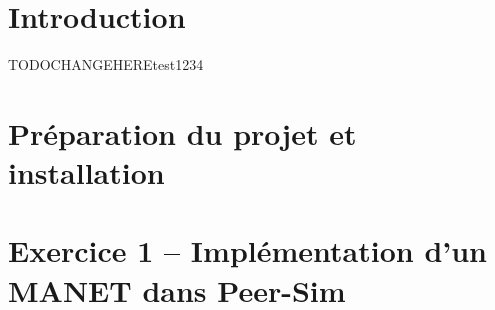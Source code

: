 \documentclass[11pt,a4paper,sans]{report}
\begin{document}
\newpage
\tableofcontents
\vspace*{3cm}
\begingroup\let\clearpage\relax

	\newpage
	\chapter{Introduction}

	\begin{comment}
		TODO intro du projet, nos remarques. + Explication du fichier de config accompagnées d’un fichier texte "Readme"
		indiquant comment compiler le projet et lancer les différentes simulations (votre projet doit pouvoir se compiler/lancer en dehors d’Eclipse) Votre rapport, au format pdf, concis, dans lequel vous devez répondre aux questions posées dans le sujet.
	\end{comment}

	TODOCHANGEHEREtest1234\cite{greenwade93}

	\newpage
	\chapter{Préparation du projet et installation}
	\newpage
	\chapter{Exercice 1 – Implémentation d’un MANET dans Peer-Sim}
\end{document}
